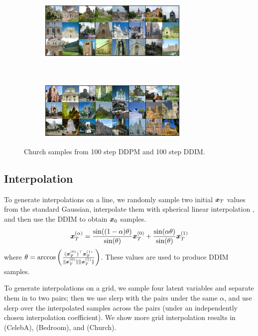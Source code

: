 \begin{figure}
    \centering
    \begin{subfigure}{\textwidth}
    \centering
    \includegraphics[width=0.8\textwidth]{figures/church-samples-uniform-100-ddpm.pdf}
    \end{subfigure}
    ~
    \begin{subfigure}{\textwidth}
    \centering
    \includegraphics[width=0.8\textwidth]{figures/church-samples-uniform-100-ddim.pdf}
    \end{subfigure}
    \caption{Church samples from 100 step DDPM and 100 step DDIM.}
    \label{fig:church-samples}
\end{figure}



\subsection{Interpolation}
\label{app:interpolation}
To generate interpolations on a line, we randomly sample two initial ${\bm{x}}_T$ values from the standard Gaussian, interpolate them with spherical linear interpolation \citep{shoemake1985animating}, and then use the DDIM to obtain ${\bm{x}}_0$ samples.
\begin{align}
    {\bm{x}}_T^{(\alpha)} =  \frac{\sin((1 - \alpha) \theta)}{\sin(\theta)} {\bm{x}}_{T}^{(0)} + \frac{\sin(\alpha \theta)}{\sin(\theta)} {\bm{x}}_{T}^{(1)}
\end{align}
where $\theta = \arccos\left(\frac{({\bm{x}}_T^{(0)})^\top {\bm{x}}_T^{(1)}}{{\lVert {{\bm{x}}_T^{(0)}} \rVert} {\lVert {{\bm{x}}_T^{(1)}} \rVert}}\right)$. These values are used to produce DDIM samples.

To generate interpolations on a grid, we sample four latent variables and separate them in to two pairs; then we use slerp with the pairs under the same $\alpha$, and use slerp over the interpolated samples across the pairs (under an independently chosen interpolation coefficient). We show more grid interpolation results in  (CelebA),  (Bedroom), and  (Church).


